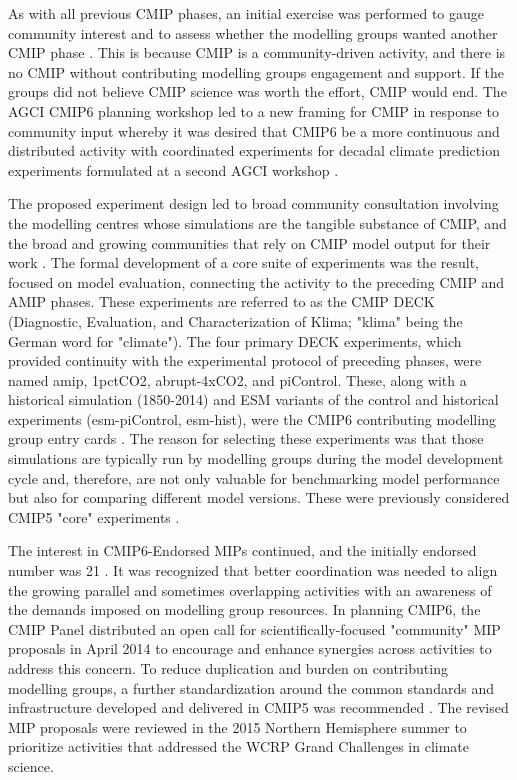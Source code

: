 \documentclass[manuscript]{copernicus}
\begin{document}
As with all previous CMIP phases, an initial exercise was performed to gauge community interest and to assess whether the modelling groups wanted another CMIP phase \citep{stouffer_cmip5_2017}. This is because CMIP is a community-driven activity, and there is no CMIP without contributing modelling groups engagement and support. If the groups did not believe CMIP science was worth the effort, CMIP would end. The AGCI CMIP6 planning workshop led to a new framing for CMIP in response to community input whereby it was desired that CMIP6 be a more continuous and distributed activity \citep{meehl_climate_2014} with coordinated experiments for decadal climate prediction experiments formulated at a second AGCI workshop \citep{meehl_decadal_2014}.

The proposed experiment design led to broad community consultation involving the modelling centres whose simulations are the tangible substance of CMIP, and the broad and growing communities that rely on CMIP model output for their work \citep{eyring_overview_2016}. The formal development of a core suite of experiments was the result, focused on model evaluation, connecting the activity to the preceding CMIP and AMIP phases. These experiments are referred to as the CMIP DECK (Diagnostic, Evaluation, and Characterization of Klima; "klima" being the German word for "climate"). The four primary DECK experiments, which provided continuity with the experimental protocol of preceding phases, were named amip, 1pctCO2, abrupt-4xCO2, and piControl. These, along with a historical simulation (1850-2014) and ESM variants of the control and historical experiments (esm-piControl, esm-hist), were the CMIP6 contributing modelling group entry cards \citep{eyring_overview_2016}. The reason for selecting these experiments was that those simulations are typically run by modelling groups during the model development cycle and, therefore, are not only valuable for benchmarking model performance but also for comparing different model versions. These were previously considered CMIP5 "core" experiments \citep{stouffer_cmip5_2011}.

The interest in CMIP6-Endorsed MIPs continued, and the initially endorsed number was 21 \citep[\autoref{tab:tab2-CMIP6MIPs};][]{eyring_overview_2016}. It was recognized that better coordination was needed to align the growing parallel and sometimes overlapping activities with an awareness of the demands imposed on modelling group resources. In planning CMIP6, the CMIP Panel distributed an open call for scientifically-focused "community" MIP proposals in April 2014 to encourage and enhance synergies across activities to address this concern. To reduce duplication and burden on contributing modelling groups, a further standardization around the common standards and infrastructure developed and delivered in CMIP5 was recommended \citep{eyring_overview_2016}. The revised MIP proposals were reviewed in the 2015 Northern Hemisphere summer to prioritize activities that addressed the WCRP Grand Challenges in climate science.
\end{document}
